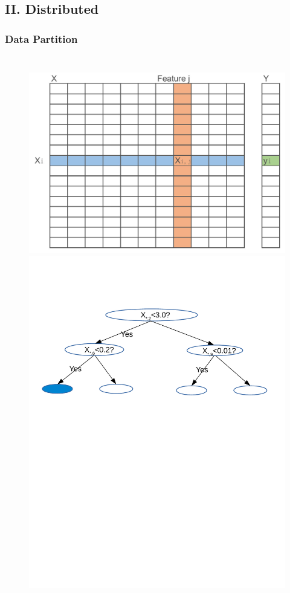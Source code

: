 \documentclass{beamer}
\begin{document}
\subsection{II. Distributed} 
\begin{frame}
	\frametitle{Data Partition}
	\begin{columns}[c] %
		
		\begin{figure}
			\includegraphics[width=1\linewidth]{figs/dataset.jpg} \\
			\includegraphics[width=1\linewidth]{figs/dtree}
		\end{figure}
		

\end{columns}
\end{frame}
\end{document}
